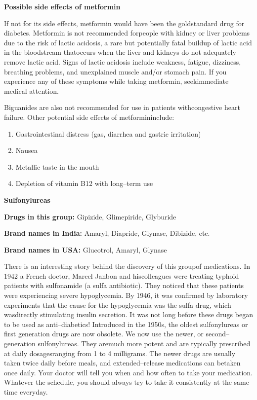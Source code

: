 \clearpage

\noindent\textbf{Possible side effects of metformin}

If not for its side effects, metformin would have been the gold\break standard drug for diabetes. Metformin is not recommended for\break people with kidney or liver problems due to the risk of lactic acidosis, a rare but potentially fatal buildup of lactic acid in the bloodstream that\break occurs when the liver and kidneys do not adequately remove lactic acid. Signs of lactic acidosis include weakness, fatigue, dizziness, brea\-thing problems, and unexplained muscle and/or stomach pain. If you experience any of these symptoms while taking metformin, seek\break immediate medical attention.

Biguanides are also not recommended for use in patients with\break congestive heart failure. Other potential side effects of metformin\break include:

\begin{enumerate}[•]
\itemsep=0pt
\item Gastrointestinal distress (gas, diarrhea and gastric irritation)
\item Nausea
\item Metallic taste in the mouth
\item Depletion of vitamin B12 with long–term use
\end{enumerate}

\textbf{Sulfonylureas}

\textbf{Drugs in this group:} Gipizide, Glimepiride, Glyburide

\textbf{Brand names in India:} Amaryl, Diapride, Glynase, Dibizide, etc.

\textbf{Brand names in USA:} Glucotrol, Amaryl, Glynase

There is an interesting story behind the discovery of this group\break of medications. In 1942 a French doctor, Marcel Janbon and his\break colleagues were treating typhoid patients with sulfonamide (a sulfa anti\-biotic). They noticed that these patients were experiencing severe hypoglycemia. By 1946, it was confirmed by laboratory experiments that the cause for the hypoglycemia was the sulfa drug, which was\break directly stimulating insulin secretion. It was not long before these drugs began to be used as anti–diabetics! Introduced in the 1950s, the oldest sulfonylureas or first generation drugs are now obsolete. We now use the newer, or second–generation sulfonylureas. They are\break much more potent and are typically prescribed at daily dosages\break ranging from 1 to 4 milligrams. The newer drugs are usually taken twice daily before meals, and extended–release medications can be\break taken once daily. Your doctor will tell you when and how often to take your medication. Whatever the schedule, you should always try to take it consistently at the same time everyday.

